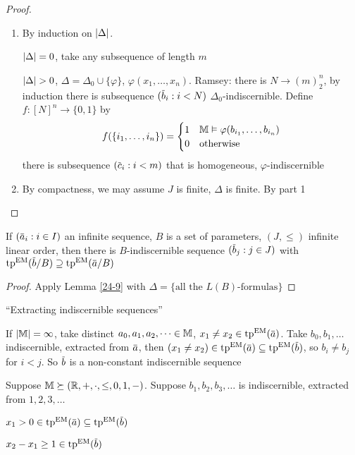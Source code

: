 \documentclass[11pt]{article}
\begin{document}
\begin{proof}
\begin{enumerate}
\item By induction on \(\abs{\Delta}\).

\(\abs{\Delta}=0\), take any subsequence of length \(m\)

\(\abs{\Delta}>0\), \(\Delta=\Delta_0\cup\{\varphi\}\), \(\varphi(x_1,\dots,x_n)\). Ramsey: there is \(N\to(m)^n_2\), by induction
there is subsequence \((\barb_i:i<N)\) \(\Delta_0\)-indiscernible. Define \(f:[N]^n\to\{0,1\}\) by
\begin{equation*}
f(\{i_1,\dots,i_n\})=
\begin{cases}
1&\mathbb{M}\vDash\varphi(b_{i_1},\dots,b_{i_n})\\
0&\text{otherwise}
\end{cases}
\end{equation*}
there is subsequence \((\barc_i:i<m)\) that is homogeneous, \(\varphi\)-indiscernible

\item By compactness, we may assume \(J\) is finite, \(\Delta\) is finite. By part 1
\end{enumerate}
\end{proof}

\begin{theorem}[]
If \((\bara_i:i\in I)\) an infinite sequence, \(B\) is a set of parameters, \((J,\le)\) infinite
linear order, then there is \(B\)-indiscernible sequence \((\barb_j:j\in J)\) with
\(\tp^{\EM}(\barb/B)\supseteq\tp^{\EM}(\bara/B)\)
\end{theorem}

\begin{proof}
Apply Lemma \ref{24-9} with \(\Delta=\{\text{all the }L(B)\text{-formulas}\}\)
\end{proof}

``Extracting indiscernible sequences''

\begin{examplle}[=Theorem 17 last week]
If \(\abs{\M}=\infty\), take distinct \(a_0,a_1,a_2,\dots\in\mathbb{M}\), \(x_1\neq x_2\in\tp^{\EM}(\bara)\).
Take \(b_0,b_1,\dots\) indiscernible, extracted from \(\bara\),
then \((x_1\neq x_2)\in\tp^{\EM}(\bara)\subseteq\tp^{\EM}(\barb)\), so \(b_i\neq b_j\) for \(i<j\). So \(\barb\) is
a non-constant indiscernible sequence
\end{examplle}

\begin{examplle}[]
Suppose \(\mathbb{M}\succeq(\mathbb{R},+,\cdot,\le,0,1,-)\). Suppose \(b_1,b_2,b_3,\dots\) is indiscernible, extracted
from \(1,2,3,\dots\)

\(x_1>0\in\tp^{\EM}(\bara)\subseteq\tp^{\EM}(\barb)\)

\(x_2-x_1\ge 1\in\tp^{\EM}(\barb)\)
\end{examplle}
\end{document}

